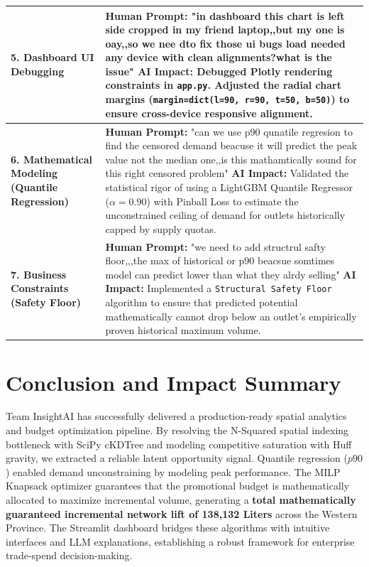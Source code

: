 \documentclass[10pt,a4paper]{article}
\begin{document}
\begin{table}[H]
\begin{tabular}{|p{}|p{}|}
        \textbf{5. Dashboard UI Debugging} & 
        \textbf{Human Prompt:} "in dashboard this chart is left side cropped in my friend laptop,,but my one is oay,,so we nee dto fix those ui bugs load needed any device with clean alignments?what is the issue" \newline 
        \textbf{AI Impact:} Debugged Plotly rendering constraints in \texttt{app.py}. Adjusted the radial chart margins (\texttt{margin=dict(l=90, r=90, t=50, b=50)}) to ensure cross-device responsive alignment. \\ \hline

        \textbf{6. Mathematical Modeling (Quantile Regression)} & 
        \textbf{Human Prompt:} "can we use p90 qunatile regresion to find the censored demand beacuse it will predict the peak value not the median one,,is this mathamtically sound for this right censored problem" \newline 
        \textbf{AI Impact:} Validated the statistical rigor of using a LightGBM Quantile Regressor ($\alpha=0.90$) with Pinball Loss to estimate the unconstrained ceiling of demand for outlets historically capped by supply quotas. \\ \hline
        
        \textbf{7. Business Constraints (Safety Floor)} & 
        \textbf{Human Prompt:} "we need to add structrul safty floor,,,the max of historical or p90 beacsue somtimes model can predict lower than what they alrdy selling" \newline 
        \textbf{AI Impact:} Implemented a \texttt{Structural Safety Floor} algorithm to ensure that predicted potential mathematically cannot drop below an outlet's empirically proven historical maximum volume. \\ \hline
    \end{tabular}
\end{table}

\section{Conclusion and Impact Summary}
Team InsightAI has successfully delivered a production-ready spatial analytics and budget optimization pipeline. By resolving the N-Squared spatial indexing bottleneck with SciPy cKDTree and modeling competitive saturation with Huff gravity, we extracted a reliable latent opportunity signal. Quantile regression ($p90$) enabled demand unconstraining by modeling peak performance. The MILP Knapsack optimizer guarantees that the promotional budget is mathematically allocated to maximize incremental volume, generating a \textbf{total mathematically guaranteed incremental network lift of 138,132 Liters} across the Western Province. The Streamlit dashboard bridges these algorithms with intuitive interfaces and LLM explanations, establishing a robust framework for enterprise trade-spend decision-making.
\end{document}
